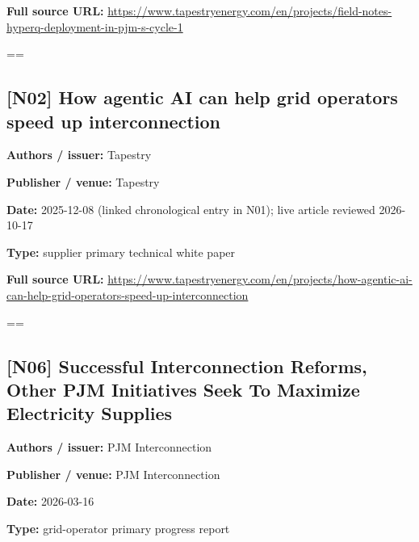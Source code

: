 \documentclass[10pt,letterpaper]{article}
\begin{document}
\textbf{Full source URL:} \href{https://www.tapestryenergy.com/en/projects/field-notes-hyperq-deployment-in-pjm-s-cycle-1}{\small\ttfamily https:/\allowbreak{}/\allowbreak{}www.\allowbreak{}tapestryenergy.\allowbreak{}com/\allowbreak{}en/\allowbreak{}projects/\allowbreak{}field-\allowbreak{}notes-\allowbreak{}hyperq-\allowbreak{}deployment-\allowbreak{}in-\allowbreak{}pjm-\allowbreak{}s-\allowbreak{}cycle-\allowbreak{}1}\par
\egroup\par\noindent\box\readingEntry\par\medskip
\setbox\readingEntry=\vbox\bgroup\hsize=\linewidth\subsection*{[N02] How agentic AI can help grid operators speed up interconnection}
\textbf{Authors / issuer:} Tapestry\par
\textbf{Publisher / venue:} Tapestry\par
\textbf{Date:} 2025-12-08 (linked chronological entry in N01); live article reviewed 2026-10-17\par
\textbf{Type:} supplier primary technical white paper\par
\textbf{Full source URL:} \href{https://www.tapestryenergy.com/en/projects/how-agentic-ai-can-help-grid-operators-speed-up-interconnection}{\small\ttfamily https:/\allowbreak{}/\allowbreak{}www.\allowbreak{}tapestryenergy.\allowbreak{}com/\allowbreak{}en/\allowbreak{}projects/\allowbreak{}how-\allowbreak{}agentic-\allowbreak{}ai-\allowbreak{}can-\allowbreak{}help-\allowbreak{}grid-\allowbreak{}operators-\allowbreak{}speed-\allowbreak{}up-\allowbreak{}interconnection}\par
\egroup\par\noindent\box\readingEntry\par\medskip
\setbox\readingEntry=\vbox\bgroup\hsize=\linewidth\subsection*{[N06] Successful Interconnection Reforms, Other PJM Initiatives Seek To Maximize Electricity Supplies}
\textbf{Authors / issuer:} PJM Interconnection\par
\textbf{Publisher / venue:} PJM Interconnection\par
\textbf{Date:} 2026-03-16\par
\textbf{Type:} grid-operator primary progress report\par
\end{document}
